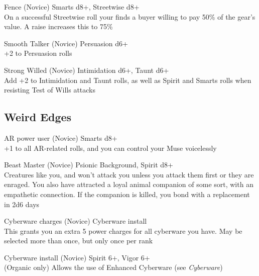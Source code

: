 \begin{multicols}{2}
\begin{genericsection}{Fence (Novice)}
Smarts d8+, Streetwise d8+\\
On a successful Streetwise roll your finds a buyer willing to pay 50\% of the gear’s value. A
raise increases this to 75\%
\end{genericsection}
 
\begin{genericsection}{Smooth Talker (Novice)}
Persuasion d6+\\
+2 to Persuasion rolls
\end{genericsection}

\begin{genericsection}{Strong Willed (Novice)}
Intimidation d6+, Taunt d6+\\
Add +2 to Intimidation and Taunt rolls, as well as Spirit and Smarts rolls when resisting Test of Wills attacks
\end{genericsection}

%
%
\subsection{Weird Edges}

\begin{genericsection}{AR power user (Novice)}
Smarts d8+\\
+1 to all AR-related rolls, and you can control your Muse voicelessly
\end{genericsection}

\begin{genericsection}{Beast Master (Novice)}
Psionic Background, Spirit d8+\\
Creatures like you, and won't attack you unless you attack them first or they are enraged. You also have attracted a loyal animal companion of some sort, with an empathetic connection. If the companion is killed, you bond with a replacement in 2d6 days
\end{genericsection}

\begin{genericsection}{Cyberware charges (Novice)}
Cyberware install\\
This grants you an extra 5 power charges for all cyberware you have. May be selected more than once, but only once per rank
\end{genericsection}

\begin{genericsection}{Cyberware install (Novice)}
Spirit 6+, Vigor 6+\\
(Organic only) Allows the use of Enhanced Cyberware (see \textit{Cyberware})
\end{genericsection}


\end{multicols}
